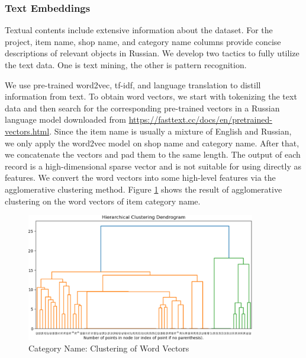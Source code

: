 \documentclass{article}
\begin{document}
\subsubsection{Text Embeddings}
Textual contents include extensive information about the dataset. For the project, item name, shop name, and category name columns provide concise descriptions of relevant objects in Russian. We develop two tactics to fully utilize the text data. One is text mining, the other is pattern recognition.\par
We use pre-trained word2vec, tf-idf, and language translation to distill information from text. To obtain word vectors, we start with tokenizing the text data and then search for the corresponding pre-trained vectors in a Russian language model downloaded from \url{https://fasttext.cc/docs/en/pretrained-vectors.html}. Since the item name is usually a mixture of English and Russian, we only apply the word2vec model on shop name and category name. After that, we concatenate the vectors and pad them to the same length. The output of each record is a high-dimensional sparse vector and is not suitable for using directly as features. We convert the word vectors into some high-level features via the agglomerative clustering method. Figure \ref{fig:agg} shows the result of agglomerative clustering on the word vectors of item category name. 

\begin{figure}[!ht]
    \centering
    \includegraphics[width=10cm]{./figs/agg.png}
    \caption{Category Name: Clustering of Word Vectors}
    \label{fig:agg}
\end{figure}
\end{document}
